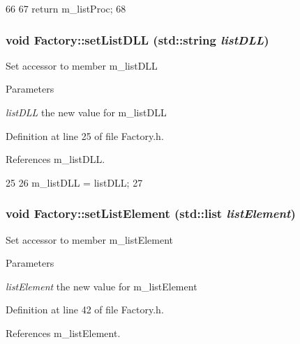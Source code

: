 \begin{DoxyCode}
66                         {
67     return m_listProc;
68   }
\end{DoxyCode}
\hypertarget{classFactory_a0f10adde2d57c8a1d07fdb4557f3ac3b}{
\subsubsection[{setListDLL}]{\setlength{\rightskip}{0pt plus 5cm}void Factory::setListDLL (std::string {\em listDLL})}}
\label{classFactory_a0f10adde2d57c8a1d07fdb4557f3ac3b}
Set accessor to member m\_\-listDLL 
\begin{DoxyParams}{Parameters}
\item[{\em listDLL}]the new value for m\_\-listDLL \end{DoxyParams}


Definition at line 25 of file Factory.h.

References m\_\-listDLL.


\begin{DoxyCode}
25                                       {
26     m_listDLL = listDLL;
27   }
\end{DoxyCode}
\hypertarget{classFactory_a7bc368f81d0228931a44b41b27c39b53}{
\subsubsection[{setListElement}]{\setlength{\rightskip}{0pt plus 5cm}void Factory::setListElement (std::list {\em listElement})}}
\label{classFactory_a7bc368f81d0228931a44b41b27c39b53}
Set accessor to member m\_\-listElement 
\begin{DoxyParams}{Parameters}
\item[{\em listElement}]the new value for m\_\-listElement \end{DoxyParams}


Definition at line 42 of file Factory.h.

References m\_\-listElement.


